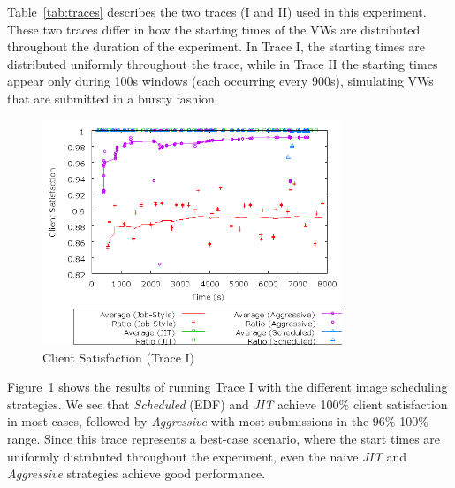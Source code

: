 Table~\ref{tab:traces} describes the two traces (I and II) used in this experiment.
These two traces differ in how the starting times of the VWs are
distributed throughout the duration of the experiment. In Trace I, the
starting times are distributed uniformly throughout the trace, while in
Trace II the starting times appear only during 100s windows (each
occurring every 900s), simulating VWs that are submitted in a bursty
fashion.

\begin{figure}
  \begin{center}
    \includegraphics[width=0.8\textwidth]{figures/ClientSatisfaction-UniformStartTimes.png}
    \caption{Client Satisfaction (Trace I)}
	\label{fig:clientsatisfactionI}
  \end{center}
\end{figure}

Figure~\ref{fig:clientsatisfactionI} shows the results of running Trace I with the different image scheduling
strategies. We see that \emph{Scheduled} (EDF) and \emph{JIT} achieve 100\%
client satisfaction in most cases, followed by \emph{Aggressive} with
most submissions in the 96\%{}-100\% range. Since this trace represents
a best{}-case scenario, where the start times are uniformly distributed
throughout the experiment, even the na\"ive \emph{JIT} and
\emph{Aggressive} strategies achieve good performance.

